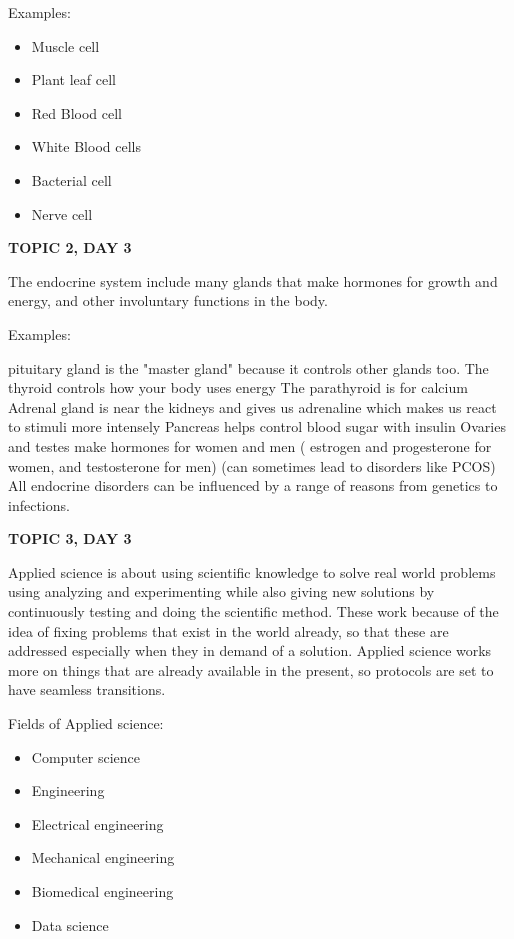 {{{Examples:
\begin{itemize}
    \item Muscle cell
    \item Plant leaf cell
    \item Red Blood cell
    \item White Blood cells
    \item Bacterial cell
    \item Nerve cell
\end{itemize}

\textbf{TOPIC 2, DAY 3}


The endocrine system include many glands that make hormones for growth and energy, and other involuntary functions in the body. 

Examples: 

pituitary gland is the "master gland" because it controls other glands too. 
The thyroid controls how your body uses energy
The parathyroid is for calcium
Adrenal gland is near the kidneys and gives us adrenaline which makes us react to stimuli more intensely
Pancreas helps control blood sugar with insulin
Ovaries and testes make hormones for women and men ( estrogen and progesterone for women, and testosterone for men) (can sometimes lead to disorders like PCOS) 
All endocrine disorders can be influenced by a range of reasons from genetics to infections. 

\textbf{TOPIC 3, DAY 3}


Applied science is about using scientific knowledge to solve real world problems using analyzing and experimenting while also giving new solutions by continuously testing and doing the scientific method. These work because of the idea of fixing problems that exist in the world already, so that these are addressed especially when they in demand of a solution. Applied science works more on things that are already available in the present, so protocols are set to have seamless transitions.


Fields of Applied science:
\begin{itemize}
    \item Computer science
    \item Engineering
    \item Electrical engineering
    \item Mechanical engineering
    \item Biomedical engineering
    \item Data science
\end{itemize}

}}}
